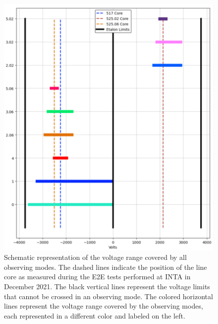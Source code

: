 \begin{figure}[t]
    \begin{minipage}[c]{0.67\textwidth}
      \includegraphics[width=\textwidth]{figures/Pipeline/obs_modes.pdf}
    \end{minipage}\hfill
    \begin{minipage}[c]{0.29\textwidth}
      \caption[Voltage ranges of TuMag's observation modes.]{
       Schematic representation of the voltage range covered by all observing modes. The dashed lines indicate the position of the line core as measured during the E2E tests performed at INTA in December 2021. The black vertical lines represent the voltage limits that cannot be crossed in an observing mode. The colored horizontal lines represent the voltage range covered by the observing modes, each represented in a different color and labeled on the left.  
       \label{fig_pipeline: Observing modes ranges}} 
    \end{minipage}
\end{figure}


